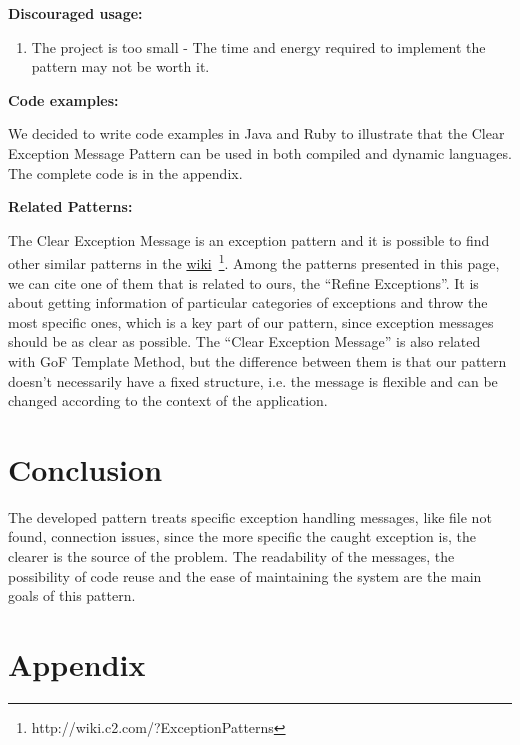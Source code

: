 \documentclass[12pt]{article}
\begin{document}
\begin{flushleft}
\textbf{Discouraged usage:}
\end{flushleft}

\begin{enumerate}
\item The project is too small - The time and energy required to implement the pattern may not be worth it.
\end{enumerate}

\begin{flushleft}
\textbf{Code examples:}
\end{flushleft}
We decided to write code examples in Java and Ruby to illustrate that the Clear Exception Message Pattern can be used in both compiled and dynamic languages. The complete code is in the appendix.

\begin{flushleft}
\textbf{Related Patterns:}
\end{flushleft}

The Clear Exception Message is an exception pattern and it is possible to find other similar patterns in the \href{http://wiki.c2.com/?ExceptionPatterns}{wiki}~\footnote{http://wiki.c2.com/?ExceptionPatterns}. 
Among the patterns presented in this page, we can cite one of them that is related to ours, the ``Refine Exceptions''. It is about getting information of particular categories of exceptions and throw the most specific ones, which is a key part of our pattern, since exception messages should be as clear as possible.
The ``Clear Exception Message'' is also related with GoF Template Method, but the difference between them is that our pattern doesn't necessarily have a fixed structure, i.e. the message is flexible and can be changed according to the context of the application.

\section{Conclusion}

The developed pattern treats specific exception handling messages, like file not found, connection issues, since the more specific the caught exception is, the clearer is the source of the problem. The readability of the messages, the possibility of code reuse and the ease of maintaining the system are the main goals of this pattern.




\newpage

\appendix
\section{Appendix}


\end{document}
